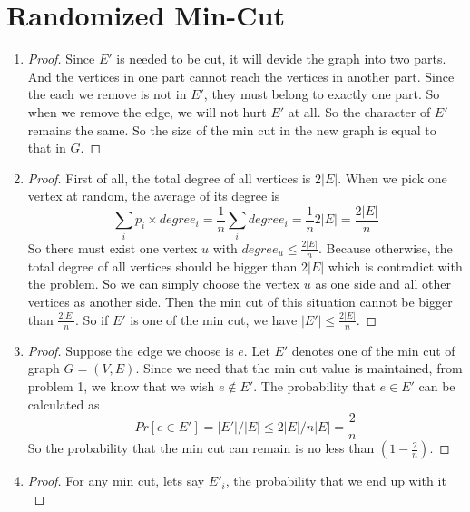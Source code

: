 \documentclass{article}
\begin{document}
	\section{Randomized Min-Cut}
		\begin{enumerate}
			\item \begin{proof}
				Since $E'$ is needed to be cut, it will devide the graph into two parts. And the vertices in one part cannot reach the vertices in another part. Since the each we remove is not in $E'$, they must belong to exactly one part. So when we remove the edge, we will not hurt $E'$ at all. So the character of $E'$ remains the same. So the size of the min cut in the new graph is equal to that in $G$.
			\end{proof}
			\item \begin{proof}First of all, the total degree of all vertices is $2|E|$. When we pick one vertex at random, the average of its degree is \begin{equation}
				\sum_i p_i \times degree_i = \frac{1}{n}\sum_i degree_i = \frac{1}{n} 2|E| = \frac{2|E|}{n}
			\end{equation}
			So there must exist one vertex $u$ with $degree_u \leq \frac{2|E|}{n}$. Because otherwise, the total degree of all vertices should be bigger than $2|E|$ which is contradict with the problem. So we can simply choose the vertex $u$ as one side and all other vertices as another side. Then the min cut of this situation cannot be bigger than $\frac{2|E|}{n}$. So if $E'$ is one of the min cut, we have $|E'| \leq \frac{2|E|}{n}$. \end{proof}
			\item \begin{proof}
				Suppose the edge we choose is $e$. Let $E'$ denotes one of the min cut of graph $G = (V, E)$. Since we need that the min cut value is maintained, from problem 1, we know that we wish $e \not\in E'$. The probability that $e \in E'$ can be calculated as \begin{equation}
					Pr\left[e \in E'\right] = |E'| / |E| \leq 2|E| / n|E| = \frac{2}{n}
				\end{equation}
				So the probability that the min cut can remain is no less than $(1 - \frac{2}{n})$. \end{proof}
			\item \begin{proof}For any min cut, lets say $E'_i$, the probability that we end up with it \begin{equation}

\end{equation}
\end{proof}
\end{enumerate}
\end{document}
